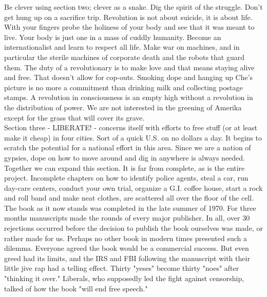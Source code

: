 \documentclass[11pt,twoside,a4paper]{book}
\begin{document}
\clearpage

Be clever using section two; clever as a snake. Dig the spirit of the struggle. Don't get hung up on a sacrifice trip. Revolution is not about suicide, it is about life. With your fingers probe the holiness of your body and see that it was meant to live. Your body is just one in a mass of cuddly humanity. Become an internationalist and learn to respect all life. Make war on machines, and in particular the sterile machines of corporate death and the robots that guard them.  The duty of a revolutionary is to make love and that means staying alive and free. That doesn't allow for cop-outs. Smoking dope and hanging up Che's picture is no more a commitment than drinking milk and collecting postage stamps. A revolution in consciousness is an empty high without a revolution in the distribution of power. We are not interested in the greening of Amerika except for the grass that will cover its grave.~\\

Section three - LIBERATE! - concerns itself with efforts to free stuff (or at least make it cheap) in four cities. Sort of a quick U.S. on no dollars a day. It begins to scratch the potential for a national effort in this area. Since we are a nation of gypsies, dope on how to move around and dig in anywhere is always needed. Together we can expand this section. It is far from complete, as is the entire project. Incomplete chapters on how to identify police agents, steal a car, run day-care centers, conduct your own trial, organize a G.I. coffee house, start a rock and roll band and make neat clothes, are scattered all over the floor of the cell. The book as it now stands was completed in the late summer of 1970. For three months manuscripts made the rounds of every major publisher. In all, over 30 rejections occurred before the decision to publish the book ourselves was made, or rather made for us. Perhaps no other book in modern times presented such a dilemma. Everyone agreed the book would be a commercial success. But even greed had its limits, and the IRS and FBI following the manuscript with their little jive rap had a telling effect. Thirty "yeses" become thirty "noes" after "thinking it over." Liberals, who supposedly led the fight against censorship, talked of how the book "will end free speech." ~\\
\end{document}
